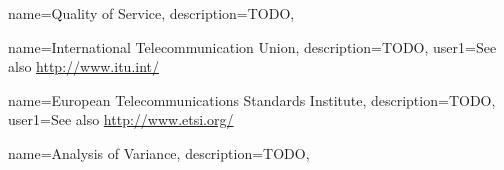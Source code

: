 {
  name=Quality of Service,
  description={TODO},
}


{
  name=International Telecommunication Union,
  description={TODO},
  user1={See also \url{http://www.itu.int/}}
}

{
  name=European Telecommunications Standards Institute,
  description={TODO},
  user1={See also \url{http://www.etsi.org/}}
}

{
  name=Analysis of Variance,
  description={TODO},
}


